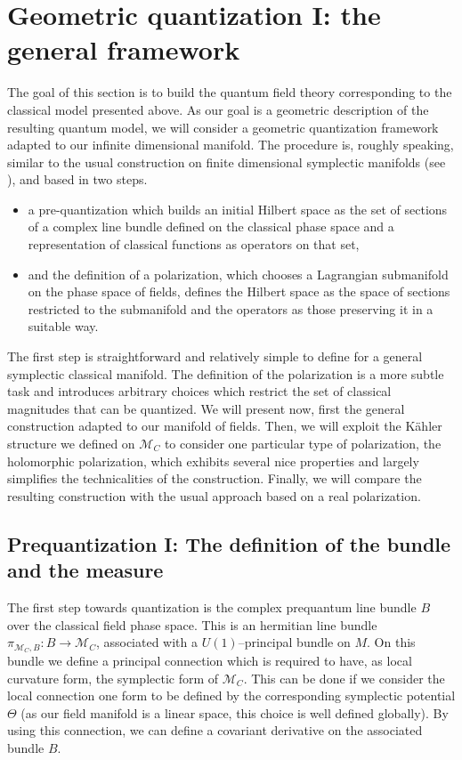 \documentclass[12pt]{article}%
\begin{document}
\section{ Geometric quantization I: the general framework}
\label{sec:QFTCauchy}

The goal of this section is to build the quantum field theory corresponding to the classical model presented above. As our goal is a geometric description of the resulting quantum model, we will consider a geometric quantization framework adapted to our infinite dimensional manifold. The procedure is, roughly speaking, similar to the usual construction on finite dimensional symplectic manifolds (see \cite{Woodhouse1997}), and based in two steps.
\begin{itemize}
	\item a pre-quantization which builds an initial Hilbert space as the set of sections of a complex line bundle defined on the classical phase space and a representation of classical functions as operators on that set, 
	\item and the definition of a polarization, which chooses a Lagrangian submanifold on the phase space of fields, defines the Hilbert space as the space of sections restricted to the submanifold and the operators as those preserving it in a suitable way.
\end{itemize}
The first step is straightforward and relatively simple to define for a general symplectic classical manifold. The definition of the polarization is a more subtle task and introduces arbitrary choices which restrict the set of classical magnitudes that can be quantized.   We will present now, first the general construction adapted to our manifold of fields. Then, we will exploit the Kähler structure we defined on $\mathcal{M}_C$ to consider one particular type of polarization, the holomorphic polarization, which exhibits several nice properties and largely simplifies the technicalities of the construction. Finally, we will compare the resulting construction with the usual approach based on a real polarization.

\subsection{Prequantization I: The definition of the bundle and the measure}

The first step towards quantization is the complex prequantum line bundle $B$ over the classical field phase space. This is an hermitian line bundle $\pi_{\mathcal{M}_C,B}:B\rightarrow \mathcal{M}_C$, associated with a $U(1)$--principal bundle on $M$. On this bundle we define a principal connection which is required to have, as local curvature form, the symplectic form of $\mathcal{M}_C$. This can be done if we consider the local connection one form to be defined by the corresponding symplectic potential $\Theta$ (as our field manifold is a linear space, this choice is well defined globally). By using this connection, we can define a covariant derivative on the associated bundle $B$.
\end{document}
